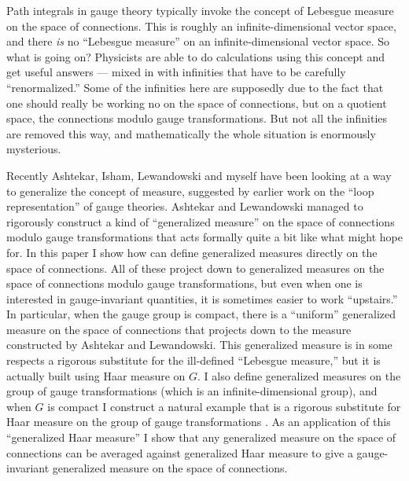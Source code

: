 \documentclass{article}
\def\tightlist{}
\renewcommand{\texttt}[1]{%
  \begingroup
  \ttfamily
  \begingroup\lccode`~=`/\lowercase{\endgroup\def~}{/\discretionary{}{}{}}%
  \begingroup\lccode`~=`[\lowercase{\endgroup\def~}{[\discretionary{}{}{}}%
  \begingroup\lccode`~=`.\lowercase{\endgroup\def~}{.\discretionary{}{}{}}%
  \catcode`/=\active\catcode`[=\active\catcode`.=\active
  \scantokens{#1\noexpand}%
  \endgroup
}
\begin{document}

Path integrals in gauge theory typically invoke the concept of Lebesgue
measure on the space of connections. This is roughly an
infinite-dimensional vector space, and there \emph{is} no ``Lebesgue
measure'' on an infinite-dimensional vector space. So what is going on?
Physicists are able to do calculations using this concept and get useful
answers --- mixed in with infinities that have to be carefully
``renormalized.'' Some of the infinities here are supposedly due to the
fact that one should really be working no on the space of connections,
but on a quotient space, the connections modulo gauge transformations.
But not all the infinities are removed this way, and mathematically the
whole situation is enormously mysterious.

Recently Ashtekar, Isham, Lewandowski and myself have been looking at a
way to generalize the concept of measure, suggested by earlier work on
the ``loop representation'' of gauge theories. Ashtekar and Lewandowski
managed to rigorously construct a kind of ``generalized measure'' on the
space of connections modulo gauge transformations that acts formally
quite a bit like what might hope for. In this paper I show how can
define generalized measures directly on the space of connections. All of
these project down to generalized measures on the space of connections
modulo gauge transformations, but even when one is interested in
gauge-invariant quantities, it is sometimes easier to work ``upstairs.''
In particular, when the gauge group is compact, there is a ``uniform''
generalized measure on the space of connections that projects down to
the measure constructed by Ashtekar and Lewandowski. This generalized
measure is in some respects a rigorous substitute for the ill-defined
``Lebesgue measure,'' but it is actually built using Haar measure on
\(G\). I also define generalized measures on the group of gauge
transformations (which is an infinite-dimensional group), and when \(G\)
is compact I construct a natural example that is a rigorous substitute
for Haar measure on the group of gauge transformations . As an
application of this ``generalized Haar measure'' I show that any
generalized measure on the space of connections can be averaged against
generalized Haar measure to give a gauge-invariant generalized measure
on the space of connections.
\end{document}
